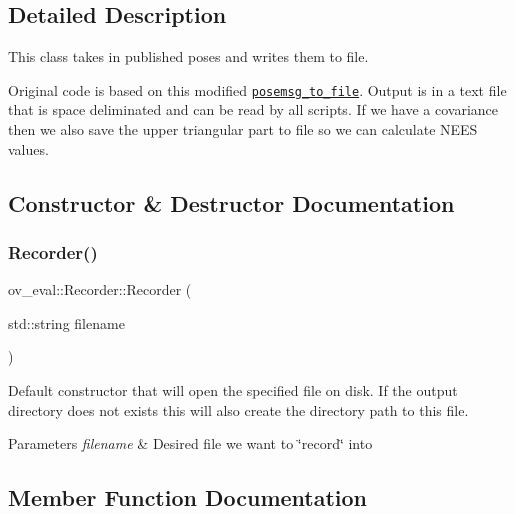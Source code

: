 \subsection{Detailed Description}
This class takes in published poses and writes them to file. 

Original code is based on this modified \href{https://github.com/rpng/posemsg_to_file/}{\tt posemsg\+\_\+to\+\_\+file}. Output is in a text file that is space deliminated and can be read by all scripts. If we have a covariance then we also save the upper triangular part to file so we can calculate N\+E\+ES values. 

\subsection{Constructor \& Destructor Documentation}
\mbox{\label{classov__eval_1_1Recorder_a36307659369029395731737a7577bf0a}} 
\subsubsection{\texorpdfstring{Recorder()}{Recorder()}}
{\footnotesize\ttfamily ov\+\_\+eval\+::\+Recorder\+::\+Recorder (\begin{DoxyParamCaption}\item[{std\+::string}]{filename }\end{DoxyParamCaption})\hspace{0.3cm}{\ttfamily [inline]}}



Default constructor that will open the specified file on disk. If the output directory does not exists this will also create the directory path to this file. 


\begin{DoxyParams}{Parameters}
{\em filename} & Desired file we want to \char`\"{}record\char`\"{} into \\
\hline
\end{DoxyParams}


\subsection{Member Function Documentation}
\mbox{\label{classov__eval_1_1Recorder_a731eae3cf076afc70a7e590f5e8943fe}} 
